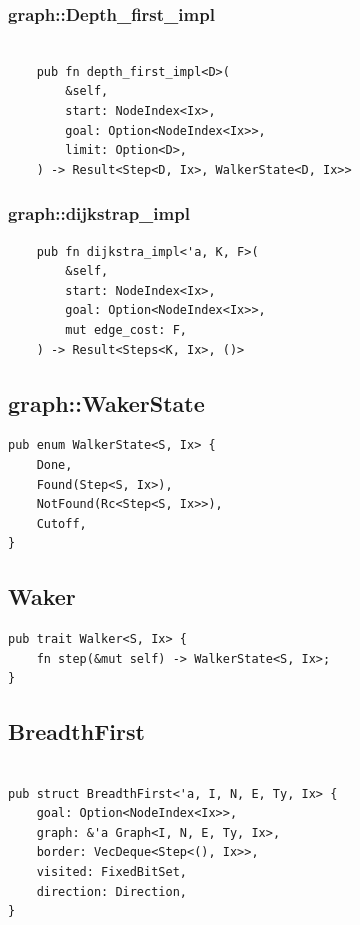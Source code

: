 \subsubsection{graph::Depth\_first\_impl}
\begin{verbatim}

    pub fn depth_first_impl<D>(
        &self,
        start: NodeIndex<Ix>,
        goal: Option<NodeIndex<Ix>>,
        limit: Option<D>,
    ) -> Result<Step<D, Ix>, WalkerState<D, Ix>>

\end{verbatim}


\subsubsection{graph::dijkstrap\_impl}
\begin{verbatim}
    pub fn dijkstra_impl<'a, K, F>(
        &self,
        start: NodeIndex<Ix>,
        goal: Option<NodeIndex<Ix>>,
        mut edge_cost: F,
    ) -> Result<Steps<K, Ix>, ()>

\end{verbatim}

\subsection{graph::WakerState}
\begin{verbatim}
pub enum WalkerState<S, Ix> {
    Done,
    Found(Step<S, Ix>),
    NotFound(Rc<Step<S, Ix>>),
    Cutoff,
}
\end{verbatim}

\subsection{Waker}
\begin{verbatim}
pub trait Walker<S, Ix> {
    fn step(&mut self) -> WalkerState<S, Ix>;
}
\end{verbatim}
\subsection{BreadthFirst}
\begin{verbatim}

pub struct BreadthFirst<'a, I, N, E, Ty, Ix> {
    goal: Option<NodeIndex<Ix>>,
    graph: &'a Graph<I, N, E, Ty, Ix>,
    border: VecDeque<Step<(), Ix>>,
    visited: FixedBitSet,
    direction: Direction,
}
\end{verbatim}

